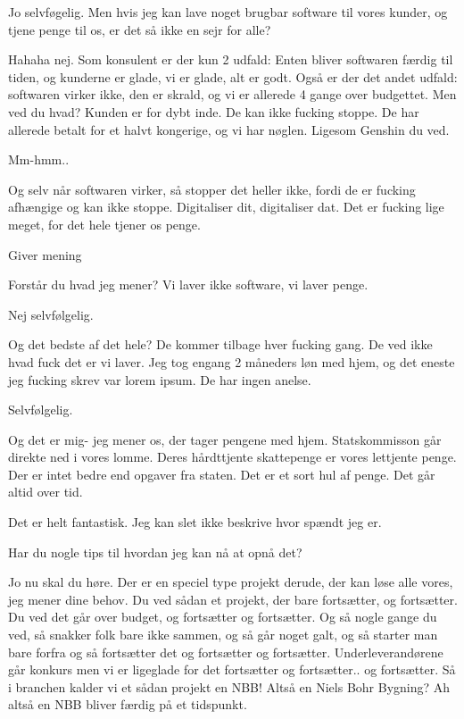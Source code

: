 \documentclass[a4paper,11pt]{article}
\begin{document}
\begin{sketch}
 Jo selvføgelig. Men hvis jeg kan lave noget brugbar software til vores kunder, og tjene penge til os, er det så ikke en sejr for alle?


 Hahaha nej. Som konsulent er der kun 2 udfald: Enten bliver softwaren færdig til tiden, og kunderne er glade, vi er glade, alt er godt. Også er der det andet udfald: softwaren virker ikke, den er skrald, og vi er allerede 4 gange over budgettet. Men ved du hvad? Kunden er for dybt inde. De kan ikke fucking stoppe. De har allerede betalt for et halvt kongerige, og vi har nøglen. Ligesom Genshin du ved.

 Mm-hmm..

 Og selv når softwaren virker, så stopper det heller ikke, fordi de er fucking afhængige og kan ikke stoppe. Digitaliser dit, digitaliser dat. Det er fucking lige meget, for det hele tjener os penge.

 Giver mening

 Forstår du hvad jeg mener? Vi laver ikke software, vi laver penge.

 Nej selvfølgelig.

 Og det bedste af det hele? De kommer tilbage hver fucking gang. De ved ikke hvad fuck det er vi laver. Jeg tog engang 2 måneders løn med hjem, og det eneste jeg fucking skrev var lorem ipsum. De har ingen anelse.

 Selvfølgelig.

 Og det er mig- jeg mener os, der tager pengene med hjem. Statskommisson går direkte ned i vores lomme. Deres hårdttjente skattepenge er vores lettjente penge. Der er intet bedre end opgaver fra staten. Det er et sort hul af penge. Det går altid over tid.

 Det er helt fantastisk. Jeg kan slet ikke beskrive hvor spændt jeg er.

 Har du nogle tips til hvordan jeg kan nå at opnå det?


 Jo nu skal du høre. Der er en speciel type projekt derude, der kan løse alle vores, jeg mener dine behov. Du ved sådan et projekt, der bare fortsætter, og fortsætter. Du ved det går over budget, og fortsætter og fortsætter. Og så nogle gange du ved, så snakker folk bare ikke sammen, og så går noget galt, og så starter man bare forfra og så fortsætter det og fortsætter og fortsætter. Underleverandørene går konkurs men vi er ligeglade for det fortsætter og fortsætter.. og fortsætter. Så i branchen kalder vi et sådan projekt en NBB!
 Altså en Niels Bohr Bygning?
 Ah altså en NBB bliver færdig på et tidspunkt.









\end{sketch}
\end{document}
